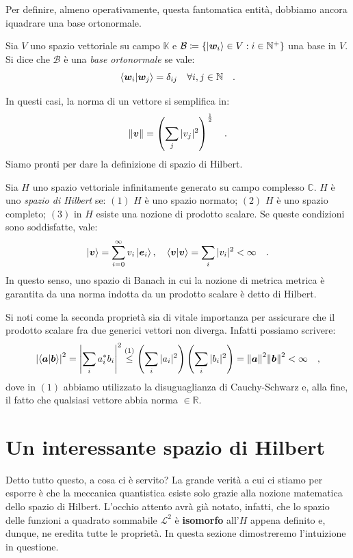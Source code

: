Per definire, almeno operativamente, questa fantomatica entità, dobbiamo ancora iquadrare una base ortonormale.

\begin{definizione}
    Sia $V$ uno spazio vettoriale su campo $\mathbb{K}$ e $\mathcal{B} \coloneq \{ \ket{\bm{w}_i} \in V : i \in \mathbb{N}^+ \}$ una base in $V$. Si dice che $\mathcal{B}$ è una \emph{base ortonormale} se vale:
    \[
        \bra{\bm{w}_i} \ket{\bm{w}_j} = \delta_{ij} \quad \forall i,j \in \mathbb{N} \quad.
    \]
\end{definizione}
In questi casi, la norma di un vettore si semplifica in:
\[
    \norm{\bm{v}} = \left(\sum_j |v_j|^2 \right)^{\frac{1}{2}} \quad.
\]
Siamo pronti per dare la definizione di spazio di Hilbert. 
\begin{definizione}
    Sia $H$ uno spazio vettoriale infinitamente generato su campo complesso $\mathbb{C}$. $H$ è uno \textit{spazio di Hilbert} se: $(1)$ $H$ è uno spazio normato; $(2)$ $H$ è uno spazio completo; $(3)$ in $H$ esiste una nozione di prodotto scalare. Se queste condizioni sono soddisfatte, vale:
    \[
        \ket{\bm{v}} = \sum_{i = 0}^\infty v_i \ket{\bm{e}_i}, \quad \bra{\bm{v}}\ket{\bm{v}} = \sum_i |v_i|^2 < \infty \quad.
    \]
    In questo senso, uno spazio di Banach in cui la nozione di metrica metrica è garantita da una norma indotta da un prodotto scalare è detto di Hilbert.
\end{definizione}
Si noti come la seconda proprietà sia di vitale importanza per assicurare che il prodotto scalare fra due generici vettori non diverga. Infatti possiamo scrivere:
\[
    \left|\bra{\bm{a}}\ket{\bm{b}}\right|^2 = \left| \sum_i a_i^* b_i \right|^2 \overset{(1)}{\leq} \left( \sum_i |a_i|^2 \right) \left( \sum_i |b_i|^2 \right) = \norm{\bm{a}}^2 \norm{\bm{b}}^2 < \infty \quad,
\]
dove in $(1)$ abbiamo utilizzato la disuguaglianza di Cauchy-Schwarz e, alla fine, il fatto che qualsiasi vettore abbia norma $\in \mathbb{R}$.

\section{Un interessante spazio di Hilbert}
Detto tutto questo, a cosa ci è servito? La grande verità a cui ci stiamo per esporre è che la meccanica quantistica esiste solo grazie alla nozione matematica dello spazio di Hilbert. L'occhio attento avrà già notato, infatti, che lo spazio delle funzioni a quadrato sommabile $\mathcal{L}^2$ è \textbf{isomorfo} all'$H$ appena definito e, dunque, ne eredita tutte le proprietà. In questa sezione dimostreremo l'intuizione in questione. 

